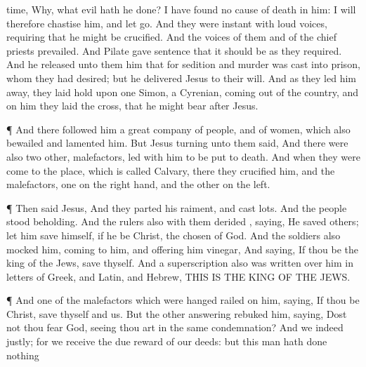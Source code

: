 {time,
Why,
what
evil
hath
he
done? I have
found
no
cause of
death
in
him: I
will
therefore
chastise
him, and
let
{}
go.
And they were
instant with
loud
voices,
requiring
that
he might be
crucified.
And the
voices of
them
and of the chief
priests
prevailed.
And
Pilate gave
sentence that it should
be as
they
required.
And he
released unto
them him
that
for
sedition
and
murder was
cast
into
prison,
whom they had
desired;
but he
delivered
Jesus to
their
will.
And
as they
led
him
away, they laid hold
upon
one
Simon, a
Cyrenian, coming
out
of the
country,
and on
him they
laid the
cross, that he might
bear
{}
after
Jesus.
\par }{\PP {}¶
And there
followed
him a
great
company of
people,
and of
women,
which
also
bewailed
and
lamented
him.
But
Jesus
turning
unto
them
said,
{}
And there
were
also
two
other,
malefactors, led
with
him to be put to
death.
And
when they were
come
to the
place,
which is
called
Calvary,
there they
crucified
him,
and the
malefactors,
one
on the right
hand,
and the
other
on the
left.
\par }{\PP {}¶
Then
said
Jesus,
{}
And they
parted
his
raiment, and
cast
lots.
And the
people
stood
beholding.
And the
rulers
also
with
them
derided
{},
saying, He
saved
others; let him
save
himself,
if
he
be
Christ, the
chosen of
God.
And the
soldiers
also
mocked
him, coming
to
him,
and offering
him
vinegar,
And
saying,
If
thou
be the
king of the
Jews,
save
thyself.
And a
superscription
also
was
written
over
him in
letters of
Greek,
and
Latin,
and
Hebrew,
THIS
IS THE
KING OF THE
JEWS.
\par }{\PP {}¶
And
one of the
malefactors
which were
hanged
railed on
him,
saying,
If
thou
be
Christ,
save
thyself
and
us.
But the
other
answering
rebuked
him,
saying,
Dost
not
thou
fear
God,
seeing thou
art
in the
same
condemnation?
And
we
indeed
justly;
for we
receive the due
reward of our
deeds:
but this
man hath
done
nothing
}

